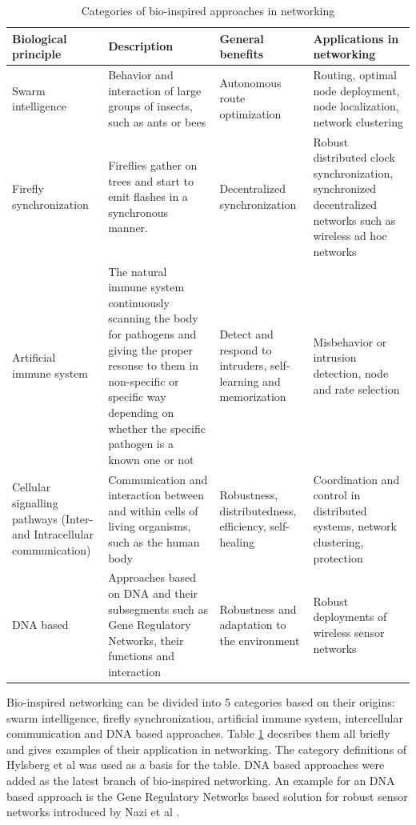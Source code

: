 \documentclass[cameraready]{IWORK2014}
\begin{document}
\begin{table}
	\begin{tabularx}{0.90\textwidth}{|X|X|X|X|}
		\hline \textbf{Biological principle} & \textbf{Description} & \textbf{General benefits} & \textbf{Applications in networking} \\ \hline
		Swarm intelligence & Behavior and interaction of large groups of insects, such as ants or bees & Autonomous route optimization & Routing, optimal node deployment, node localization, network clustering \\ \hline
		Firefly synchronization & Fireflies gather on trees and start to emit flashes in a synchronous manner. & Decentralized synchronization & Robust distributed clock synchronization, synchronized decentralized networks such as wireless ad hoc networks \\ \hline
		Artificial immune system & The natural immune system continuously scanning the body for pathogens and giving the proper resonse to them in non-specific or specific way depending on whether the specific pathogen is a known one or not & Detect and respond to intruders, self-learning and memorization & Misbehavior or intrusion detection, node and rate selection \\ \hline
		Cellular signalling pathways (Inter- and Intracellular communication) & Communication and interaction between and within cells of living organisms, such as the human body & Robustness, distributedness, efficiency, self-healing & Coordination and control in distributed systems, network clustering, protection \\ \hline
		DNA based & Approaches based on DNA and their subsegments such as Gene Regulatory Networks, their functions and interaction & Robustness and adaptation to the environment & Robust deployments of wireless sensor networks \\ \hline
	\end{tabularx}
	\caption{Categories of bio-inspired approaches in networking}
	\label{tbl:bio-categories}
\end{table}

Bio-inspired networking can be divided into 5 categories based on their origins: swarm intelligence, firefly synchronization, artificial immune system, intercellular communication and DNA based approaches. Table \ref{tbl:bio-categories} decsribes them all briefly and gives examples of their application in networking. The category definitions of Hylsberg et al \cite{hylsberg2011bioinspired} was used as a basis for the table. DNA based approaches were added as the latest branch of bio-inspired networking. An example for an DNA based approach is the Gene Regulatory Networks based solution for robust sensor networks introduced by Nazi et al \cite{nazi2014deployment}.
\end{document}
